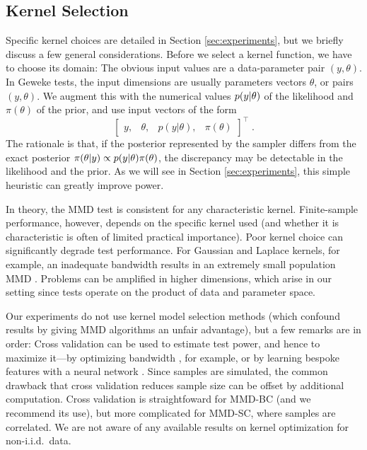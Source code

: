 \documentclass{article}
\begin{document}
\subsection{Kernel Selection}\label{sec:kernel_selection}
Specific kernel choices are detailed in Section \ref{sec:experiments}, but we briefly discuss a few general considerations.
Before we select a kernel function, we have to choose its domain:
The obvious input values are a data-parameter pair $(y,\theta)$. In Geweke tests, the input dimensions are usually parameters vectors $\theta$, or pairs $(y,\theta)$. We augment this with the numerical values $p(y\vert\theta)$ of the likelihood and $\pi(\theta)$ of the prior, and use input vectors of the form
\[\begin{bmatrix}y,&\theta, & p(y|\theta), & \pi(\theta) \end{bmatrix}^{\top}\;.\]
The rationale is that, if the posterior represented by the sampler differs from the exact posterior $\pi(\theta|y) \propto p(y\vert \theta)\pi(\theta)$, the discrepancy may be detectable in the likelihood and the prior. As we will see in Section \ref{sec:experiments}, this simple heuristic can greatly improve power.

In theory, the MMD test is consistent for any characteristic kernel. Finite-sample performance, however, depends on the specific kernel used (and whether it is characteristic is often of limited practical importance). Poor kernel choice can significantly degrade test performance. For Gaussian and Laplace kernels, for example, an inadequate bandwidth results in an extremely small population MMD \citep{reddi_decreasing_2014}. Problems can be amplified in higher dimensions, which arise in our setting since tests operate on the product of data and parameter space.

Our experiments do not use kernel model selection methods (which confound results by giving MMD algorithms an unfair advantage), but a few remarks are in order: Cross validation can be used to estimate test power, and hence to maximize it---by optimizing bandwidth \citep{Gretton2012, Sutherland2017}, for example, or by learning bespoke features with a neural network \citep{Liu2020}. Since samples are simulated, the common drawback that cross validation reduces sample size can be offset by additional computation.  
Cross validation is straightfoward for MMD-BC (and we recommend its use), but more complicated for MMD-SC, where
samples are correlated. We are not aware of any available results on kernel optimization for non-i.i.d.\ data.
\end{document}
